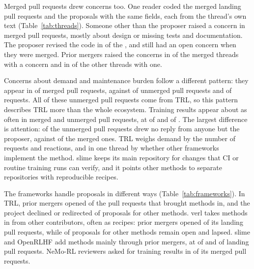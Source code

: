 \documentclass{article}
\begin{document}
Merged pull requests drew concerns too. One reader coded the \RevMN{} merged landing pull requests and the \NAttemptThreads{} proposals with the same fields, each from the thread's own text (Table~\ref{tab:threads}). Someone other than the proposer raised a concern in \RevMAny{} merged pull requests, mostly about design or missing tests and documentation. The proposer revised the code in \RevMFixed{} of the \RevMN{}, and \RevMOpen{} still had an open concern when they were merged. Prior mergers raised the concerns in \RevMPrior{} of the \RevMAny{} merged threads with a concern and in \RevOtherPrior{} of the \RevOtherAny{} other threads with one.

\begin{table}[!htbp]
\centering
\small
\caption{\textbf{Review records of merged pull requests and of proposals that were not merged.} Unit: thread. Merged pull requests are the landing pull requests of recent methods, counted once each. Unmerged pull requests and requests are the proposals of Table~\ref{tab:attempts}. A concern is a problem that someone other than the proposer raises explicitly, and one thread can carry several.}
\label{tab:threads}

\end{table}

Concerns about demand and maintenance burden follow a different pattern: they appear in \RevMDS{} of \RevMN{} merged pull requests, against \RevUDS{} of \RevUN{} unmerged pull requests and \RevRDS{} of \RevRN{} requests. All of these unmerged pull requests come from TRL, so this pattern describes TRL more than the whole ecosystem. Training results appear about as often in merged and unmerged pull requests, at \RevMResults{} of \RevMN{} and \RevUResults{} of \RevUN{}. The largest difference is attention: \RevUSilent{} of the \RevUN{} unmerged pull requests drew no reply from anyone but the proposer, against \RevMSilent{} of the \RevMN{} merged ones. TRL weighs demand by the number of requests and reactions, and in one thread by whether other frameworks implement the method. slime keeps its main repository for changes that CI or routine training runs can verify, and it points other methods to separate repositories with reproducible recipes.

The frameworks handle proposals in different ways (Table~\ref{tab:frameworks}). In TRL, prior mergers opened \PrTRLMaint{} of the \PrTRLLand{} pull requests that brought methods in, and the project declined or redirected \PrTRLAttDeclined{} of \PrTRLAtt{} proposals for other methods. verl takes methods in from other contributors, often as recipes: prior mergers opened \PrverlMaint{} of its \PrverlLand{} landing pull requests, while \PrverlAttOpen{} of \PrverlAtt{} proposals for other methods remain open and \PrverlAttStale{} lapsed. slime and OpenRLHF add methods mainly through prior mergers, at \PrslimeMaint{} of \PrslimeLand{} and \PrOpenRLHFMaint{} of \PrOpenRLHFLand{} landing pull requests. NeMo-RL reviewers asked for training results in \RevNeMoMReq{} of its \RevNeMoMN{} merged pull requests.
\end{document}
